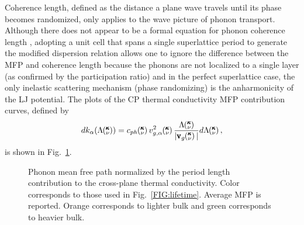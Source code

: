 Coherence length, defined as the distance a plane wave travels until its phase becomes randomized, only applies to the wave picture of phonon transport. Although there does not appear to be a formal equation for phonon coherence length \cite{chen2005nanoscale}, adopting a unit cell that spans a single superlattice period to generate the modified dispersion relation allows one to ignore the difference between the MFP and coherence length \cite{PhysRevB.67.195311} because the phonons are not localized to a single layer (as confirmed by the participation ratio) and in the perfect superlattice case, the only inelastic scattering mechanism (phase randomizing) is the anharmonicity of the LJ potential. The plots of the CP thermal conductivity MFP contribution curves, defined by
\begin{equation}\label{EQ:MFP_contr}
\begin{split}
dk_{\alpha}(\Lambda \kv)=c_{ph}\kv v^2_{g,\alpha}\kv \frac{\Lambda \kv} {|\pmb{\mathrm{v}}_{g}\kv|} d\Lambda \kv, 
\end{split}
\end{equation}
is shown in Fig.~\ref{FIG:MFP_cp}. 
\begin{figure}%
\begin{center}
\renewcommand{\figure}{Fig.}
\caption{Phonon mean free path normalized by the period length contribution to the cross-plane thermal conductivity. Color corresponds to those used in Fig.~\ref{FIG:lifetime}. Average MFP is reported. Orange corresponds to lighter bulk and green corresponds to heavier bulk.}
\label{FIG:MFP_cp}
\end{center}
\end{figure}
